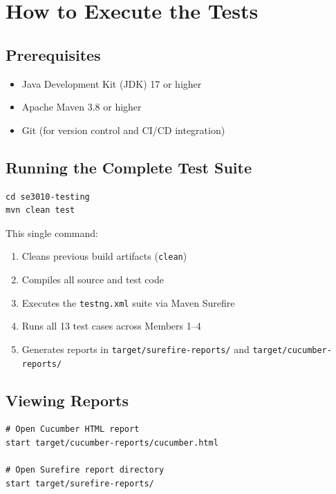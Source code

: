 \documentclass[12pt,a4paper]{article}
\begin{document}
\section{How to Execute the Tests}

\subsection{Prerequisites}

\begin{itemize}
    \item Java Development Kit (JDK) 17 or higher
    \item Apache Maven 3.8 or higher
    \item Git (for version control and CI/CD integration)
\end{itemize}

\subsection{Running the Complete Test Suite}

\begin{lstlisting}[style=bashstyle, caption={Execute all tests via Maven}]
cd se3010-testing
mvn clean test
\end{lstlisting}

This single command:
\begin{enumerate}
    \item Cleans previous build artifacts (\texttt{clean})
    \item Compiles all source and test code
    \item Executes the \texttt{testng.xml} suite via Maven Surefire
    \item Runs all 13 test cases across Members 1--4
    \item Generates reports in \texttt{target/surefire-reports/} and \texttt{target/cucumber-reports/}
\end{enumerate}

\subsection{Viewing Reports}

\begin{lstlisting}[style=bashstyle, caption={Access generated test reports}]
# Open Cucumber HTML report
start target/cucumber-reports/cucumber.html

# Open Surefire report directory
start target/surefire-reports/
\end{lstlisting}
\end{document}
